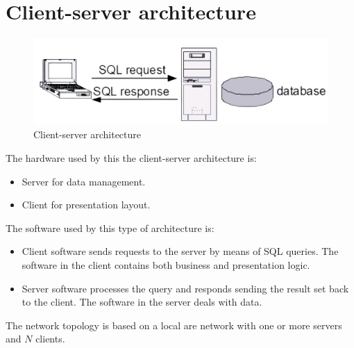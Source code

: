\section{Client-server architecture}

\begin{figure}[H]
    \centering
    \includegraphics[width=0.4\linewidth]{images/cs.png}
    \caption{Client-server architecture}
\end{figure}
The hardware used by this the client-server architecture is: 
\begin{itemize}
    \item Server for data management. 
    \item Client for presentation layout. 
\end{itemize}
The software used by this type of architecture is: 
\begin{itemize}
    \item Client software sends requests to the server by means of SQL queries. The software in the client contains both business and presentation logic. 
    \item Server software processes the query and responds sending the result set back to the client. The software in the server deals with data. 
\end{itemize}
The network topology is based on a local are network with one or more servers and $N$ clients. 